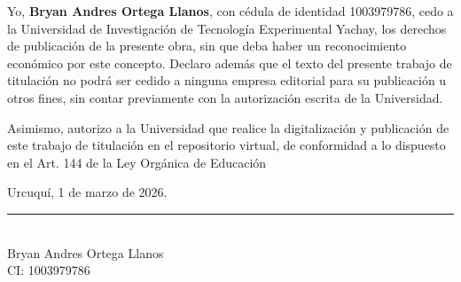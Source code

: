 Yo, \textbf{Bryan Andres Ortega Llanos}, con cédula de identidad 1003979786, cedo a la Universidad de Investigación de Tecnología Experimental Yachay, los derechos de publicación de la presente obra, sin que deba haber un reconocimiento económico por este concepto. Declaro además que el texto del presente trabajo de titulación no podrá ser cedido a ninguna empresa editorial para su publicación u otros fines, sin contar previamente con la autorización escrita de la Universidad.

\vspace{0.6cm}

\noindent Asimismo, autorizo a la Universidad que realice la digitalización y publicación de este trabajo de titulación en el repositorio virtual, de conformidad a lo dispuesto en el Art. 144 de la Ley Orgánica de Educación 

\vspace{0.6cm}

\noindent Urcuquí, 1 de marzo de 2026.

\vspace{2.5cm}

\begin{center}
    \rule[0mm]{60mm}{0.1mm} \\
    {Bryan Andres Ortega Llanos}\\
    CI: 1003979786
\end{center}

\thispagestyle{empty} %
